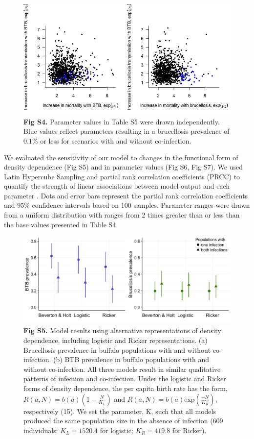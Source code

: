 \documentclass[10pt,letterpaper]{article}
\begin{document}
\begin{figure}[hb]
  \centering
  \includegraphics[width = 0.9 \textwidth]{FigureS4_MCMCparameters.png}
  \caption*{\textbf{Fig S4.} Parameter values in Table S5 were drawn independently. Blue values reflect parameters resulting in a brucellosis prevalence of $0.1\%$ or less for scenarios with and without co-infection.}
\label{fig:figS4}
\end{figure}

We evaluated the sensitivity of our model to changes in the functional form of density dependence (Fig S5) and in parameter values (Fig S6, Fig S7). 
We used Latin Hypercube Sampling and partial rank correlation coefficients (PRCC) to quantify the strength of linear associations between model output and each parameter \cite{marino_methodology_2008}. Dots and error bars represent the partial rank correlation coefficients and $95\%$ confidence intervals based on 100 samples. Parameter ranges were drawn from a uniform distribution with ranges from 2 times greater than or less than the base values presented in Table S4.

\pagebreak

\begin{figure}
  \centering
  \includegraphics[width = \textwidth]{FigureS5_densitydependence.png}
  \caption*{\textbf{Fig S5.} Model results using alternative representations of density dependence, including logistic and Ricker representations. (a) Brucellosis prevalence in buffalo populations with and without co-infection. (b) BTB prevalence in buffalo populations with and without co-infection.  All three models result in similar qualitative patterns of infection and co-infection. Under the logistic and Ricker forms of density dependence, the per capita birth rate has the form, $R(a,N) = b(a) (1- \frac{N}{K_L} )$ and $R(a,N) = b(a)$exp$(\frac{-N}{K_R})$, respectively (15).  We set the parameter, K, such that all models produced the same population size in the absence of infection (609 individuals; $K_L = 1520.4$ for logistic; $K_R = 419.8 $ for Ricker).}
\end{figure}
\end{document}
